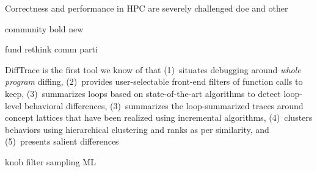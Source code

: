 Correctness and performance in HPC are severely challenged 
doe and other

community
bold new

fund rethink comm parti

DiffTrace is the first tool we know of that (1)~situates debugging around {\em whole program}
diffing, (2)~provides user-selectable front-end filters of function calls to keep,
(3)~summarizes loops based on state-of-the-art algorithms to detect loop-level
behavioral differences,
(3)~summarizes the loop-summarized
traces around concept lattices that have been realized using incremental
algorithms, (4)~clusters behaviors using hierarchical clustering and ranks as per similarity,
and (5)~presents salient differences 

knob filter
sampling
ML
 
